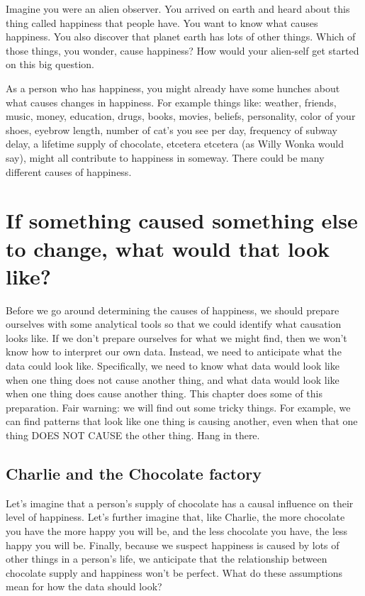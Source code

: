 \documentclass[
]{book}
\begin{document}
Imagine you were an alien observer. You arrived on earth and heard about this thing called happiness that people have. You want to know what causes happiness. You also discover that planet earth has lots of other things. Which of those things, you wonder, cause happiness? How would your alien-self get started on this big question.

As a person who has happiness, you might already have some hunches about what causes changes in happiness. For example things like: weather, friends, music, money, education, drugs, books, movies, beliefs, personality, color of your shoes, eyebrow length, number of cat's you see per day, frequency of subway delay, a lifetime supply of chocolate, etcetera etcetera (as Willy Wonka would say), might all contribute to happiness in someway. There could be many different causes of happiness.

\section{If something caused something else to change, what would that look like?}\label{if-something-caused-something-else-to-change-what-would-that-look-like}

Before we go around determining the causes of happiness, we should prepare ourselves with some analytical tools so that we could identify what causation looks like. If we don't prepare ourselves for what we might find, then we won't know how to interpret our own data. Instead, we need to anticipate what the data could look like. Specifically, we need to know what data would look like when one thing does not cause another thing, and what data would look like when one thing does cause another thing. This chapter does some of this preparation. Fair warning: we will find out some tricky things. For example, we can find patterns that look like one thing is causing another, even when that one thing DOES NOT CAUSE the other thing. Hang in there.

\subsection{Charlie and the Chocolate factory}\label{charlie-and-the-chocolate-factory}

Let's imagine that a person's supply of chocolate has a causal influence on their level of happiness. Let's further imagine that, like Charlie, the more chocolate you have the more happy you will be, and the less chocolate you have, the less happy you will be. Finally, because we suspect happiness is caused by lots of other things in a person's life, we anticipate that the relationship between chocolate supply and happiness won't be perfect. What do these assumptions mean for how the data should look?
\end{document}
